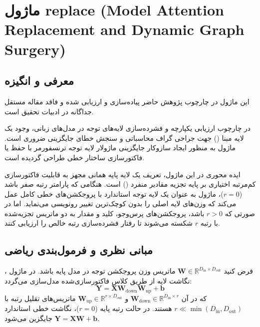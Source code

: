 \section{ماژول replace (Model Attention Replacement and Dynamic Graph Surgery)}
\label{sec:module_replace}

\subsection{معرفی و انگیزه}
این ماژول در چارچوب پژوهش حاضر پیاده‌سازی و ارزیابی شده و فاقد مقاله مستقل جداگانه در ادبیات تحقیق است.

در چارچوب ارزیابی یکپارچه و فشرده‌سازی لایه‌های توجه در مدل‌های زبانی، وجود یک لایه مبنا () جهت جراحی گراف محاسباتی و سنجش خطای جایگزینی ضروری است. ماژول  به منظور ایجاد سازوکار جایگزینی ماژولار لایه توجه ترنسفورمر با حفظ یا فاکتورسازی ساختار خطی طراحی گردیده است.

ایده محوری در این ماژول، تعریف یک لایه پایه همانی مجهز به قابلیت فاکتورسازی کم‌مرتبه اختیاری بر پایه تجزیه مقادیر منفرد () است. هنگامی که پارامتر رتبه صفر باشد ($r=0$)، ماژول به عنوان یک لایه توجه استاندارد با پروجکشن‌های خطی کامل عمل می‌کند که وزن‌های لایه اصلی را بدون کوچک‌ترین تغییر رونویسی می‌نماید. اما در صورتی که $r > 0$ باشد، پروجکشن‌های پرس‌وجو، کلید و مقدار به دو ماتریس تجزیه‌شده با رتبه $r$ شکسته می‌شوند تا رفتار فشرده‌سازی رتبه خالص را ارزیابی کنند.

\subsection{مبانی نظری و فرمول‌بندی ریاضی}
فرض کنید $\mathbf{W} \in \mathbb{R}^{D_{\text{in}} \times D_{\text{out}}}$ ماتریس وزن پروجکشن توجه در مدل پایه باشد. در ماژول ، نگاشت لایه از طریق کلاس فاکتورسازی‌شده  مدل‌سازی می‌گردد:
\begin{equation}
\mathbf{Y} = \mathbf{X} \mathbf{W}_{\text{down}} \mathbf{W}_{\text{up}} + \mathbf{b}
\end{equation}
که در آن $\mathbf{W}_{\text{down}} \in \mathbb{R}^{D_{\text{in}} \times r}$ و $\mathbf{W}_{\text{up}} \in \mathbb{R}^{r \times D_{\text{out}}}$ ماتریس‌های تقلیل رتبه با  $r \ll \min(D_{\text{in}}, D_{\text{out}})$ هستند. در حالت رتبه پایه ($r=0$)، نگاشت خطی استاندارد $\mathbf{Y} = \mathbf{X} \mathbf{W} + \mathbf{b}$ جایگزین می‌شود.

